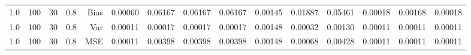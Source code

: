 \begin{table}[!htbp]
\begin{tabular}{lrrrrrrrrrrrrrr}
1.0 & 100 & 30 & 0.8 & Bias & 0.00060 & 0.06167 & 0.06167 & 0.06167 & 0.00145 & 0.01887 & 0.05461 & 0.00018 & 0.00168 & 0.00018 \\
1.0 & 100 & 30 & 0.8 & Var & 0.00011 & 0.00017 & 0.00017 & 0.00017 & 0.00148 & 0.00032 & 0.00130 & 0.00011 & 0.00011 & 0.00011 \\
1.0 & 100 & 30 & 0.8 & MSE & 0.00011 & 0.00398 & 0.00398 & 0.00398 & 0.00148 & 0.00068 & 0.00428 & 0.00011 & 0.00011 & 0.00011 \\
\hline
\end{tabular}
\end{table}

